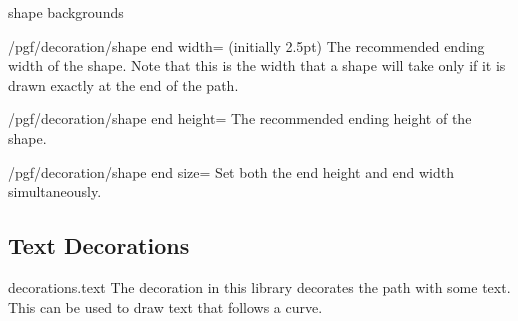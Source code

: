 \begin{decoration}{shape backgrounds}
    \begin{key}{/pgf/decoration/shape end width= (initially 2.5pt)}
        The recommended ending width of the shape. Note that this is the width
        that a shape will take only if it is drawn exactly at the end of the
        path.
\begin{codeexample}[preamble={\usetikzlibrary{decorations.shapes}}]
\end{codeexample}
    \end{key}

    \begin{key}{/pgf/decoration/shape end height=}
        The recommended ending height of the shape.
    \end{key}

    \begin{stylekey}{/pgf/decoration/shape end size=}
        Set both the end height and end width simultaneously.
    \end{stylekey}
\end{decoration}


\subsection{Text Decorations}

\begin{pgflibrary}{decorations.text}
    The decoration in this library decorates the path with some text. This can
    be used to draw text that follows a curve.
\end{pgflibrary}


